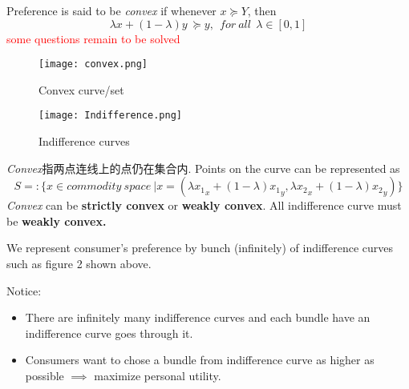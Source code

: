\documentclass[10pt]{article}
\newenvironment{changemargin}[2]{%
  \begin{list}{}{%
    \setlength{\topsep}{0pt}%
    \setlength{\leftmargin}{#1}%
    \setlength{\rightmargin}{#2}%
    \setlength{\listparindent}{\parindent}%
    \setlength{\itemindent}{\parindent}%
    \setlength{\parsep}{\parskip}%
  }%
  \item[]}{\end{list}}
\begin{document}
\begin{changemargin}{-0.125in}{0in}
\begin{enumerate}
         Preference is said to be \textit{convex} if whenever $x \succeq Y$, then 
         \[
         \lambda x + (1-\lambda)y \: \succeq y, \:\: for\:all\:\:\lambda \in [0,1]
         \]
         \textcolor{red}{some questions remain to be solved}
         
%         
       \begin{figure}[ht]
            \setlength{\abovecaptionskip}{0.cm}
            \setlength{\belowcaptionskip}{-0.cm}
           \centering
         \begin{minipage}[b]{0.4\linewidth}
         \texttt{[image: convex.png]}
         \caption{Convex curve/set}
         \label{fig:minipage1}
         \end{minipage}
         \quad
         \begin{minipage}[b]{0.4\linewidth}
         \texttt{[image: Indifference.png]}
         \caption{Indifference curves}
         \label{fig:minipage2}
         \end{minipage}
    \end{figure}


         \textit{Convex}指两点连线上的点仍在集合内. Points on the curve can be represented as 
         \[
         S =: \{x \in commodity \:space \: \big| x = (\lambda {x_1}_x + (1-\lambda){x_1}_y, \lambda {x_2}_x + (1-\lambda){x_2}_y) \}
         \]
         \textit{Convex} can be \textbf{strictly convex} or \textbf{weakly convex}. All indifference curve must be \textbf{weakly convex.}
         
         \smallskip
         
         We represent consumer's preference by bunch (infinitely) of indifference curves such as figure 2 shown above.   
         
         \smallskip
         
         Notice: 
         \begin{itemize}
         	\item There are infinitely many indifference curves and each bundle have an indifference curve goes through it. 
         	\item Consumers want to chose a bundle from indifference curve as higher as possible $\implies$ maximize personal utility.
         \end{itemize}
         

\end{enumerate}
\end{changemargin}
\end{document}
